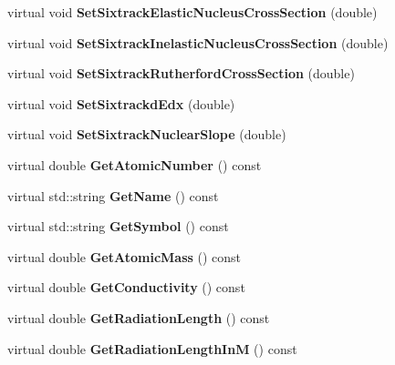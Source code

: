 \begin{DoxyCompactItemize}
virtual void {\bfseries Set\+Sixtrack\+Elastic\+Nucleus\+Cross\+Section} (double)
\item 
\mbox{\label{classMaterial_a8d81650679f3bc0b970fd8c46ae5e693}} 
virtual void {\bfseries Set\+Sixtrack\+Inelastic\+Nucleus\+Cross\+Section} (double)
\item 
\mbox{\label{classMaterial_a1c29fad42c95bd4ef037f332c8910095}} 
virtual void {\bfseries Set\+Sixtrack\+Rutherford\+Cross\+Section} (double)
\item 
\mbox{\label{classMaterial_a867a1c3af7a6f33a40ad3b4ab36823b3}} 
virtual void {\bfseries Set\+Sixtrackd\+Edx} (double)
\item 
\mbox{\label{classMaterial_a33f53a008f1b4813e7df3c1f6c1c76f8}} 
virtual void {\bfseries Set\+Sixtrack\+Nuclear\+Slope} (double)
\item 
\mbox{\label{classMaterial_a2b6995952782d23b1d6aad6bcc2786ed}} 
virtual double {\bfseries Get\+Atomic\+Number} () const
\item 
\mbox{\label{classMaterial_a68d816115f80b94e52a4a11b2703c994}} 
virtual std\+::string {\bfseries Get\+Name} () const
\item 
\mbox{\label{classMaterial_a02fb929434c0a878e150aeacfb07116f}} 
virtual std\+::string {\bfseries Get\+Symbol} () const
\item 
\mbox{\label{classMaterial_a7526794905bb9abaa826cdeeecb6d473}} 
virtual double {\bfseries Get\+Atomic\+Mass} () const
\item 
\mbox{\label{classMaterial_a47a5336149eaa97fc86e44e443412eaf}} 
virtual double {\bfseries Get\+Conductivity} () const
\item 
\mbox{\label{classMaterial_ab8246539050920a46d5e71c26a48f31c}} 
virtual double {\bfseries Get\+Radiation\+Length} () const
\item 
\mbox{\label{classMaterial_ae749da9d49789a401376d63e363f531f}} 
virtual double {\bfseries Get\+Radiation\+Length\+InM} () const

\end{DoxyCompactItemize}
